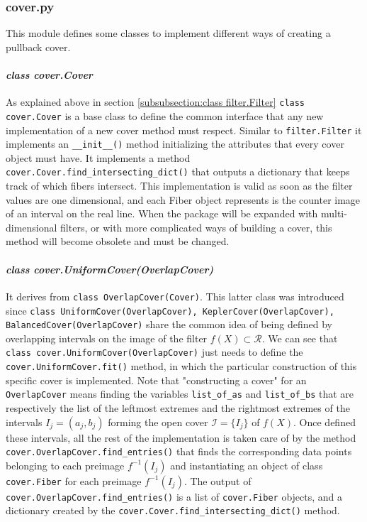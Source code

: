 \subsubsection{cover.py}
This module defines some classes to implement different ways of creating a pullback cover.
\paragraph{\textit{class cover.Cover}}
As explained above in section \ref{subsubsection:class filter.Filter} \lstinline|class cover.Cover| is a base class to define the common interface that any new implementation of a new cover method must respect. Similar to \lstinline|filter.Filter| it implements an \lstinline|__init__()| method initializing the attributes that every cover object must have. It implements a method \lstinline{cover.Cover.find_intersecting_dict()} that outputs a dictionary that keeps track of which fibers intersect. This implementation is valid as soon as the filter values are one dimensional, and each Fiber object represents is the counter image of an interval on the real line. When the package will be expanded with multi-dimensional filters, or with more complicated ways of building a cover, this method will become obsolete and must be changed.
\paragraph{\textit{class cover.UniformCover(OverlapCover)}}
It derives from \lstinline|class OverlapCover(Cover)|. This latter class was introduced since \lstinline|class UniformCover(OverlapCover), KeplerCover(OverlapCover), BalancedCover(OverlapCover)| share the common idea of being defined by overlapping intervals on the image of the filter $f(X)\subset\mathcal R$. We can see that  \lstinline|class cover.UniformCover(OverlapCover)| just needs to define the \lstinline{cover.UniformCover.fit()} method, in which the particular construction of this specific cover is implemented. Note that "constructing a cover" for an \lstinline{OverlapCover} means finding the variables  \lstinline|list_of_as| and  \lstinline|list_of_bs| that are respectively the list of the leftmost extremes and the rightmost extremes of the intervals $I_j=(a_j, b_j)$ forming the open cover $\mathcal I = \{I_j\}$ of $f(X)$. Once defined these intervals, all the rest of the implementation is taken care of by the method \lstinline|cover.OverlapCover.find_entries()| that finds the corresponding data points belonging to each preimage $f^{-1}(I_j)$ and instantiating an object of class \lstinline|cover.Fiber| for each preimage $f^{-1}(I_j)$. The output  of \lstinline|cover.OverlapCover.find_entries()| is a list of \lstinline|cover.Fiber| objects, and a dictionary created by the \lstinline|cover.Cover.find_intersecting_dict()| method.
